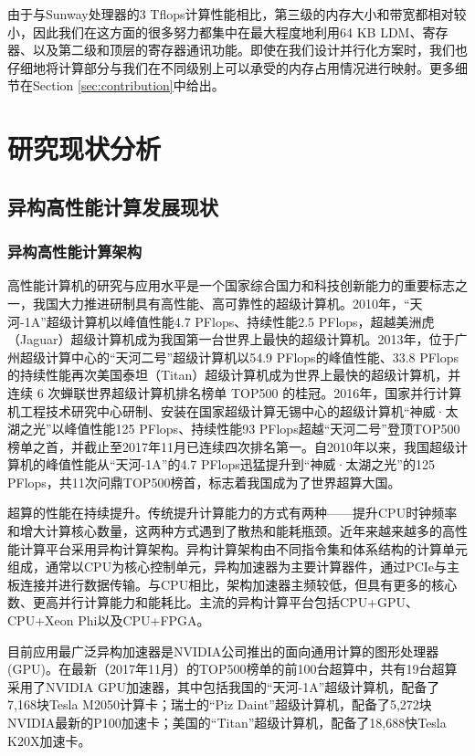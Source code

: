 \documentclass[degree=doctor]{thuthesis}
\begin{document}
由于与Sunway处理器的3 Tflops计算性能相比，第三级的内存大小和带宽都相对较小，因此我们在这方面的很多努力都集中在最大程度地利用64 KB LDM、寄存器、以及第二级和顶层的寄存器通讯功能。即使在我们设计并行化方案时，我们也仔细地将计算部分与我们在不同级别上可以承受的内存占用情况进行映射。更多细节在Section \ref{sec:contribution}中给出。

\chapter{研究现状分析}

\section{异构高性能计算发展现状}

\subsection{异构高性能计算架构}
高性能计算机的研究与应用水平是一个国家综合国力和科技创新能力的重要标志之一，我国大力推进研制具有高性能、高可靠性的超级计算机。2010年，“天河-1A”\cite{yang2011tianhe}超级计算机以峰值性能4.7 PFlops、持续性能2.5 PFlops，超越美洲虎（Jaguar）超级计算机成为我国第一台世界上最快的超级计算机。2013年，位于广州超级计算中心的“天河二号”超级计算机\cite{liao2014milkyway}以54.9 PFlops的峰值性能、33.8 PFlops的持续性能再次美国泰坦（Titan）超级计算机成为世界上最快的超级计算机，并连续 6 次蝉联世界超级计算机排名榜单 TOP500 的桂冠。2016年，国家并行计算机工程技术研究中心研制、安装在国家超级计算无锡中心的超级计算机“神威·太湖之光”\cite{fu2016sunway}以峰值性能125 PFlops、持续性能93 PFlops超越“天河二号”登顶TOP500榜单之首，并截止至2017年11月已连续四次排名第一。自2010年以来，我国超级计算机的峰值性能从“天河-1A”的4.7 PFlops迅猛提升到“神威·太湖之光”的125 PFlops，共11次问鼎TOP500榜首，标志着我国成为了世界超算大国。

超算的性能在持续提升。传统提升计算能力的方式有两种——提升CPU时钟频率和增大计算核心数量，这两种方式遇到了散热和能耗瓶颈。近年来越来越多的高性能计算平台采用异构计算架构\cite{buyya1999high}。异构计算架构由不同指令集和体系结构的计算单元组成，通常以CPU为核心控制单元，异构加速器为主要计算器件，通过PCIe与主板连接并进行数据传输。与CPU相比，架构加速器主频较低，但具有更多的核心数、更高并行计算能力和能耗比\cite{hong2010integrated}。主流的异构计算平台包括CPU+GPU、CPU+Xeon Phi以及CPU+FPGA。

目前应用最广泛异构加速器是NVIDIA公司推出的面向通用计算的图形处理器\cite{nvidia2008programming}(GPU)。在最新（2017年11月）的TOP500榜单的前100台超算中，共有19台超算采用了NVIDIA GPU加速器，其中包括我国的“天河-1A”超级计算机，配备了7,168块Tesla M2050计算卡；瑞士的“Piz Daint”超级计算机\cite{PIZDAINT}，配备了5,272块NVIDIA最新的P100加速卡；美国的“Titan”超级计算机\cite{shimpi2012inside}，配备了18,688快Tesla K20X加速卡。
\end{document}
